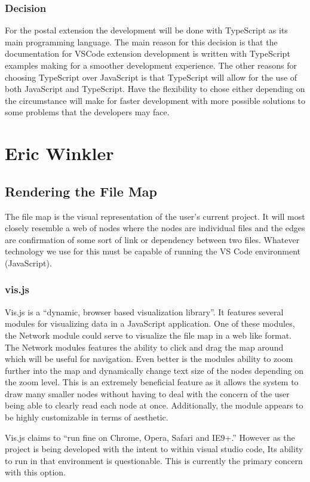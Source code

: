 \documentclass[letterpaper,10pt,titlepage,draftclsnofoot,onecolumn,onesided] {IEEEtran}
\begin{document}
\subsubsection{Decision}
For the postal extension the development will be done with TypeScript as its main programming language. 
The main reason for this decision is that the documentation for VSCode extension development is written with TypeScript examples making for a smoother development experience. 
The other reasons for choosing TypeScript over JavaScript is that TypeScript will allow for the use of both JavaScript and TypeScript. 
Have the flexibility to chose either depending on the circumstance will make for faster development with more possible solutions to some problems that the developers may face. 


\section{Eric Winkler}
\subsection{Rendering the File Map}
The file map is the visual representation of the user's current project. 
It will most closely resemble a web of nodes where the nodes are individual files and the edges are confirmation of some sort of link or dependency between two files. 
Whatever technology we use for this must be capable of running the VS Code environment (JavaScript).
\subsubsection{vis.js}
Vis.js is a ``dynamic, browser based visualization library''. 
It features several modules for visualizing data in a JavaScript application. 
One of these modules, the Network module could serve to visualize the file map in a web like format. 
The Network modules features the ability to click and drag the map around which will be useful for navigation. 
Even better is the modules ability to zoom further into the map and dynamically change text size of the nodes depending on the zoom level. 
This is an extremely beneficial feature as it allows the system to draw many smaller nodes without having to deal with the concern of the user being able to clearly read each node at once. 
Additionally, the module appears to be highly customizable in terms of aesthetic.

Vis.js claims to ``run fine on Chrome, Opera, Safari and IE9+.'' However as the project is being developed with the intent to within visual studio code, Its ability to run in that environment is questionable. This is currently the primary concern with this option.
\end{document}
